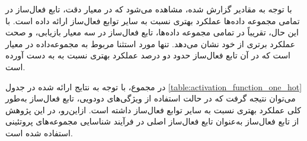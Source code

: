 با توجه به مقادیر گزارش ‌شده، مشاهده می‌شود که در معیار دقت، تابع فعال‌ساز  در تمامی مجموعه‌ داده‌ها عملکرد بهتری نسبت به سایر توابع فعال‌ساز ارائه داده است. با این حال، تقریباً در تمامی مجموعه ‌داده‌ها، تابع فعال‌ساز  در سه معیار بازیابی،  و صحت عملکرد برتری از خود نشان می‌دهد. تنها مورد استثنا مربوط به مجموعه‌داده  در معیار  است که در آن تابع فعال‌ساز  حدود دو درصد عملکرد بهتری نسبت به  به دست آورده است.

در مجموع، با توجه به نتایج ارائه‌ شده در جدول \ref{table:activation_function_one_hot} می‌توان نتیجه گرفت که در حالت استفاده از ویژگی‌های دودویی، تابع فعال‌ساز  به‌طور کلی عملکرد بهتری نسبت به سایر توابع فعال‌ساز داشته است. ازاین‌رو، در این پژوهش از تابع فعال‌ساز  به‌عنوان تابع فعال‌ساز اصلی در فرآیند شناسایی مجموعه‌های پروتئینی استفاده شده است.

